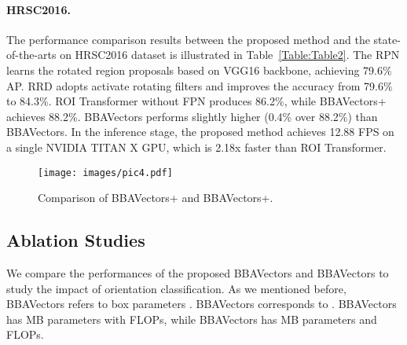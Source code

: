 \documentclass[10pt,twocolumn,letterpaper]{article}
\begin{document}
\paragraph{HRSC2016.} The performance comparison results between the proposed method and the state-of-the-arts on HRSC2016 dataset is illustrated in Table~\ref{Table:Table2}. The RPN \cite{zhang2018toward} learns the rotated region proposals based on VGG16 backbone, achieving 79.6\% AP. RRD \cite{liao2018rotation} adopts activate rotating filters and improves the accuracy from 79.6\% to 84.3\%. ROI Transformer   \cite{ding2019learning} without FPN produces 86.2\%, while BBAVectors+ achieves 88.2\%. BBAVectors performs slightly higher (0.4\% over 88.2\%) than BBAVectors. In the inference stage, the proposed method achieves 12.88 FPS on a single NVIDIA TITAN X GPU, which is 2.18x faster than ROI Transformer. 


\begin{table}
\begin{center}
\end{center}
\caption{Detection results on the testing dataset of HRSC2016. The speed of the proposed method is measured on a single NVIDIA TITAN X GPU.}
\label{Table:Table2}
\end{table} 

\begin{figure}[tbh!]
\begin{center}
   \texttt{[image: images/pic4.pdf]}
\end{center}
\caption{Comparison of BBAVectors+ and BBAVectors+.}
\label{fig:figure4}
\end{figure}


\subsection{Ablation Studies}
\label{sub:ablation studies}
We compare the performances of the proposed BBAVectors and BBAVectors to study the impact of orientation classification. As we mentioned before, BBAVectors refers to box parameters .  BBAVectors corresponds to . BBAVectors has MB parameters with  FLOPs, while BBAVectors has MB parameters and  FLOPs. 
\end{document}
